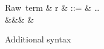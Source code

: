 \begin{figure}
\begin{syntaxfig}
\mbox{Raw term}
&
r
&
::=
&
\ldots
\\
&&&
\exLambda{\sigma}
&
\end{syntaxfig}
\caption{Additional syntax}
\end{figure}
